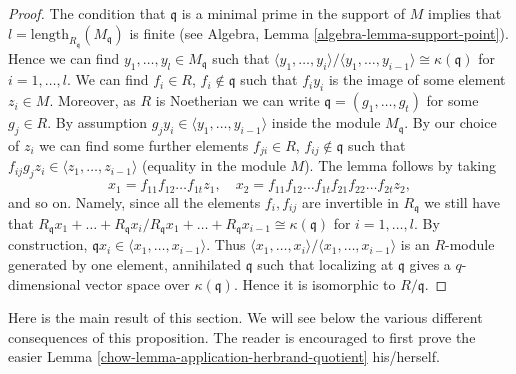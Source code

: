 \begin{proof}
The condition that $\mathfrak q$ is a minimal prime in the support
of $M$ implies that $l = \text{length}_{R_\mathfrak q}(M_\mathfrak q)$
is finite (see Algebra, Lemma \ref{algebra-lemma-support-point}).
Hence we can find $y_1, \ldots, y_l \in M_{\mathfrak q}$
such that
$\langle y_1, \ldots, y_i\rangle / \langle y_1, \ldots, y_{i - 1}\rangle
\cong \kappa(\mathfrak q)$ for $i = 1, \ldots, l$.
We can find $f_i \in R$, $f_i \not \in \mathfrak q$ such that
$f_i y_i$ is the image of some element $z_i \in M$.
Moreover, as $R$ is Noetherian we can write
$\mathfrak q = (g_1, \ldots, g_t)$ for some $g_j \in R$.
By assumption $g_j y_i \in \langle y_1, \ldots, y_{i - 1} \rangle$
inside the module $M_{\mathfrak q}$.
By our choice of $z_i$ we can find some further elements
$f_{ji} \in R$, $f_{ij} \not \in \mathfrak q$ such that
$f_{ij} g_j z_i \in \langle z_1, \ldots, z_{i - 1} \rangle$
(equality in the module $M$).
The lemma follows by taking
$$
x_1 = f_{11}f_{12}\ldots f_{1t}z_1,
\quad
x_2 = f_{11}f_{12}\ldots f_{1t}f_{21}f_{22}\ldots f_{2t}z_2,
$$
and so on. Namely, since all the elements $f_i, f_{ij}$ are invertible
in $R_{\mathfrak q}$ we still have that
$R_{\mathfrak q}x_1 + \ldots + R_{\mathfrak q}x_i /
R_{\mathfrak q}x_1 + \ldots + R_{\mathfrak q}x_{i - 1}
\cong \kappa(\mathfrak q)$ for $i = 1, \ldots, l$.
By construction, $\mathfrak q x_i \in \langle x_1, \ldots, x_{i - 1}\rangle$.
Thus $\langle x_1, \ldots, x_i\rangle / \langle x_1, \ldots, x_{i - 1}\rangle$
is an $R$-module generated by one element, annihilated $\mathfrak q$
such that localizing at $\mathfrak q$ gives a $q$-dimensional
vector space over $\kappa(\mathfrak q)$.
Hence it is isomorphic to $R/\mathfrak q$.
\end{proof}

Here is the main result of this section.
We will see below the various different
consequences of this proposition.
The reader is encouraged to first prove the easier
Lemma \ref{chow-lemma-application-herbrand-quotient} his/herself.

